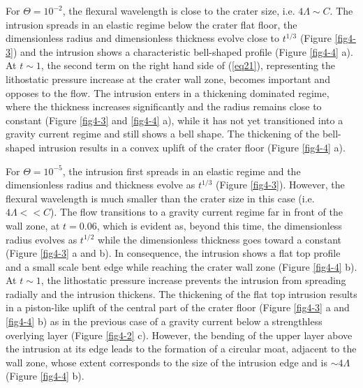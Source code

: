 \begin{article}
	For $\Theta=10^{-2}$, the flexural  wavelength is close to the
        crater size, i.e. $4\Lambda \sim  C$. The intrusion spreads in
        an   elastic  regime   below  the   crater  flat   floor,  the
        dimensionless radius and  dimensionless thickness evolve close
        to $t^{1/3}$  (Figure \ref{fig4-3}) and the  intrusion shows a
        characteristic bell-shaped profile (Figure \ref{fig4-4} a). At
        $t\sim1$,  the  second   term  on  the  right   hand  side  of
        (\ref{eq21}), representing  the lithostatic  pressure increase
        at the crater wall zone,  becomes important and opposes to the
        flow. The  intrusion enters in a  thickening dominated regime,
        where  the thickness  increases significantly  and the  radius
        remains   close   to   constant   (Figure   \ref{fig4-3}   and
        \ref{fig4-4}  a), while  it has  not yet  transitioned into  a
        gravity  current regime  and  still shows  a  bell shape.  The
        thickening of  the bell-shaped  intrusion results in  a convex
        uplift of the crater floor (Figure \ref{fig4-4} a).
		
        For  $\Theta=10^{-5}$,  the  intrusion  first  spreads  in  an
        elastic  regime and  the  dimensionless  radius and  thickness
        evolve  as  $t^{1/3}$   (Figure  \ref{fig4-3}).  However,  the
        flexural wavelength  is much smaller  than the crater  size in
        this case  (i.e. $4\Lambda <<  C$). The flow transitions  to a
        gravity  current regime  far in  front  of the  wall zone,  at
        $t=0.06$,  which   is  evident  as,  beyond   this  time,  the
        dimensionless   radius   evolves   as  $t^{1/2}$   while   the
        dimensionless  thickness   goes  toward  a   constant  (Figure
        \ref{fig4-3} a and  b). In consequence, the  intrusion shows a
        flat top  profile and a  small scale bent edge  while reaching
        the crater wall zone (Figure \ref{fig4-4} b). At $t\sim1$, the
        lithostatic  pressure  increase  prevents the  intrusion  from
        spreading radially and the  intrusion thickens. The thickening
        of the flat  top intrusion results in a  piston-like uplift of
        the central  part of the  crater floor (Figure  \ref{fig4-3} a
        and  \ref{fig4-4} b)  as in  the  previous case  of a  gravity
        current   below  a   strengthless   overlying  layer   (Figure
        \ref{fig4-2} c). However, the bending of the upper layer above
        the intrusion at its edge leads to the formation of a circular
        moat, adjacent to  the wall zone, whose  extent corresponds to
        the size of the intrusion  edge and is $\sim 4\Lambda$ (Figure
        \ref{fig4-4} b).
		 

\end{article}
